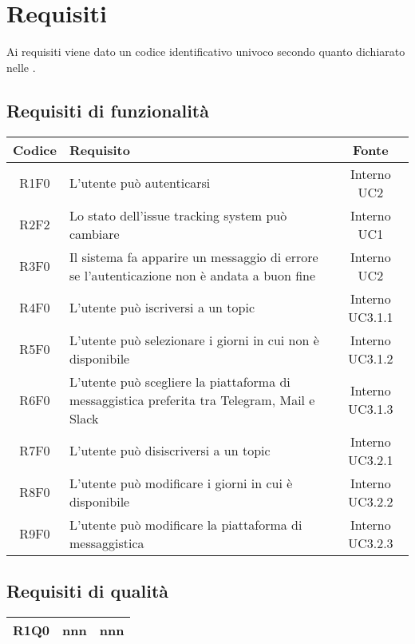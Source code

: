\section{Requisiti}
Ai requisiti viene dato un codice identificativo univoco secondo quanto dichiarato nelle . 

	\subsection{Requisiti di funzionalità}
		\begin{tabularx}{\textwidth}{ c X c } %
			Codice & Requisito & Fonte	\\ \hline
			R1F0 & L'utente può autenticarsi & Interno UC2 \\ \hline
			R2F2 & Lo stato dell'issue tracking system può cambiare & Interno UC1 \\ \hline
			R3F0 & Il sistema fa apparire un messaggio di errore se l'autenticazione non è andata a buon fine & Interno UC2 \\ \hline
			R4F0 & L'utente può iscriversi a un topic & Interno UC3.1.1	\\ \hline
			R5F0 & L'utente può selezionare i giorni in cui non è disponibile  & Interno UC3.1.2 \\ \hline
			R6F0 & L'utente può scegliere la piattaforma di messaggistica preferita tra Telegram, Mail e Slack & Interno UC3.1.3 \\ \hline
			R7F0 & L'utente può disiscriversi a un topic & Interno UC3.2.1 \\ \hline
			R8F0 & L'utente può modificare i giorni in cui è disponibile & Interno UC3.2.2  \\ \hline
			R9F0 & L'utente può modificare la piattaforma di messaggistica & Interno UC3.2.3 \\ \hline
		\end{tabularx}
	
	\subsection{Requisiti di qualità}
		\begin{tabularx}{\textwidth}{ c X c }
			R1Q0  & nnn & nnn \\ \hline
		\end{tabularx}
	
